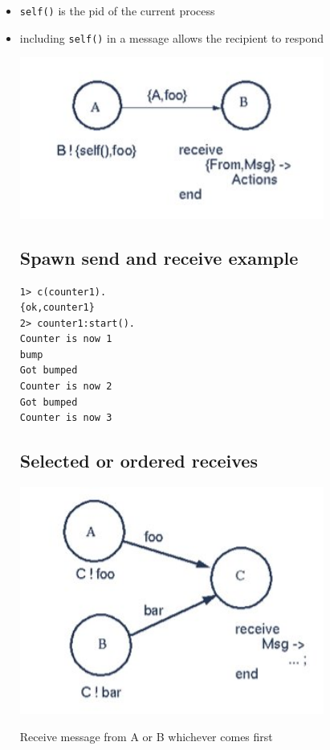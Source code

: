 \documentclass[12pt]{article}
\begin{document}
\begin{itemize}
\item \verb+self()+ is the pid of the current process
\item including \verb+self()+ in a message allows the recipient to respond

\includegraphics[width=10cm]{images/msgs1.jpg}

\subsection{Spawn send and receive example}



\begin{verbatim}
1> c(counter1).     
{ok,counter1}
2> counter1:start().
Counter is now 1
bump
Got bumped
Counter is now 2
Got bumped
Counter is now 3
\end{verbatim}

\subsection{Selected or ordered receives}

\includegraphics[width=10cm]{images/msgs2.jpg}

Receive message from A or B whichever comes first


\end{itemize}
\end{document}

